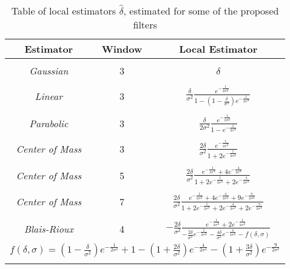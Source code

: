 \begin{table}[t!]
  \centering
  \begin{tabular}{|ccc|}

  \hline
  \textbf{Estimator}          & \textbf{Window} & \textbf{Local Estimator} \\
  \hline
  & & \\
  \textit{Gaussian}           & 3               &  $\delta$                \\ 
  & & \\ %
  \textit{Linear}             & 3               & $\frac{\delta}{\sigma^2} \frac{e^{-\frac{1}{2\sigma^2}}}{1 - \left( 1 - \frac{\delta}{\sigma^2} \right) e^{-\frac{1}{2\sigma^2}}}$ \\ 
  & & \\ %
  \textit{Parabolic}          & 3               & $\frac{\delta}{2\sigma^2} \frac{e^{-\frac{1}{2\sigma^2}}}{1-e^{-\frac{1}{2\sigma^2}}}$ \\ 
  & & \\ %
  \textit{Center of Mass}     & 3               & $ \frac{2\delta}{\sigma^2} \frac{ e^{-\frac{1}{2\sigma^2}} }
                                                                         {  1+2e^{-\frac{1}{2\sigma^2}} }$ \\ 
  & & \\ %
  \textit{Center of Mass}     & 5               & $ \frac{2\delta}{\sigma^2} \frac{ e^{-\frac{1}{2\sigma^2}} + 4e^{-\frac{4}{2\sigma^2}} }
                                                                         {1 + 2e^{-\frac{1}{2\sigma^2}} + 2e^{-\frac{4}{2\sigma^2}} }$ \\ 
  & & \\ %
  \textit{Center of Mass}     & 7               & $\frac{2\delta}{\sigma^2} \frac{ e^{-\frac{1}{2\sigma^2}} + 4e^{-\frac{4}{2\sigma^2}} + 9e^{-\frac{9}{2\sigma^2}} }
                                                                        { 1 + 2e^{-\frac{1}{2\sigma^2}} + 2e^{-\frac{4}{2\sigma^2}} + 2e^{-\frac{9}{2\sigma^2}} }$ \\ 
  & & \\ %
  \textit{Blais-Rioux}        & 4               &  $ -\frac{2\delta}{\sigma^2} \frac{ e^{-\frac{1}{2\sigma^2}} + 2e^{-\frac{1}{2\sigma^2}}}
  { -\frac{2\delta}{\sigma^2}e^{-\frac{1}{2\sigma^2}} - \frac{4\delta}{\sigma^2}e^{-\frac{4}{2\sigma^2}} 
    - f(\delta, \sigma)
  }$ \\
  \multicolumn{3}{|c|}{ $f(\delta, \sigma) =
      \left(1-\frac{\delta}{\sigma^2}\right)e^{-\frac{1}{2\sigma^2}}
      + 1
      - \left( 1+\frac{2\delta}{\sigma^2} \right)e^{-\frac{4}{2\sigma^2}}
      - \left( 1+\frac{3\delta}{\sigma^2} \right)e^{-\frac{9}{2\sigma^2}}
  $ } \\
  & & \\ 
  \hline
  \end{tabular}
  
  \caption{Table of local estimators $\hat{\delta}$, estimated for some of the proposed filters}
  \label{tab:local-mod}
\end{table}